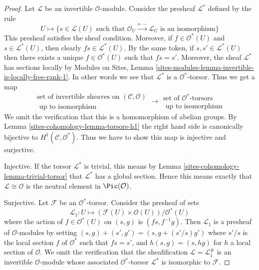 \begin{proof}
Let $\mathcal{L}$ be an invertible $\mathcal{O}$-module.
Consider the presheaf $\mathcal{L}^*$ defined by the rule
$$
U \longmapsto \{s \in \mathcal{L}(U)
\text{ such that } \mathcal{O}_U \xrightarrow{s \cdot -} \mathcal{L}_U
\text{ is an isomorphism}\}
$$
This presheaf satisfies the sheaf condition. Moreover, if
$f \in \mathcal{O}^*(U)$ and $s \in \mathcal{L}^*(U)$, then clearly
$fs \in \mathcal{L}^*(U)$. By the same token, if $s, s' \in \mathcal{L}^*(U)$
then there exists a unique $f \in \mathcal{O}^*(U)$ such that
$fs = s'$. Moreover, the sheaf $\mathcal{L}^*$ has sections locally
by Modules on Sites, Lemma
\ref{sites-modules-lemma-invertible-is-locally-free-rank-1}.
In other words we
see that $\mathcal{L}^*$ is a $\mathcal{O}^*$-torsor. Thus we get
a map
$$
\begin{matrix}
\text{set of invertible sheaves on }(\mathcal{C}, \mathcal{O}) \\
\text{ up to isomorphism}
\end{matrix}
\longrightarrow
\begin{matrix}
\text{set of }\mathcal{O}^*\text{-torsors} \\
\text{ up to isomorphism}
\end{matrix}
$$
We omit the verification that this is a homomorphism of abelian groups.
By
Lemma \ref{sites-cohomology-lemma-torsors-h1}
the right hand side is canonically
bijective to $H^1(\mathcal{C}, \mathcal{O}^*)$.
Thus we have to show this map is injective and surjective.

\medskip\noindent
Injective. If the torsor $\mathcal{L}^*$ is trivial, this means by
Lemma \ref{sites-cohomology-lemma-trivial-torsor}
that $\mathcal{L}^*$ has a global section.
Hence this means exactly that $\mathcal{L} \cong \mathcal{O}$ is
the neutral element in $\Pic(\mathcal{O})$.

\medskip\noindent
Surjective. Let $\mathcal{F}$ be an $\mathcal{O}^*$-torsor.
Consider the presheaf of sets
$$
\mathcal{L}_1 : U \longmapsto
(\mathcal{F}(U) \times \mathcal{O}(U))/\mathcal{O}^*(U)
$$
where the action of $f \in \mathcal{O}^*(U)$ on
$(s, g)$ is $(fs, f^{-1}g)$. Then $\mathcal{L}_1$ is a presheaf
of $\mathcal{O}$-modules by setting
$(s, g) + (s', g') = (s, g + (s'/s)g')$ where $s'/s$ is the local
section $f$ of $\mathcal{O}^*$ such that $fs = s'$, and
$h(s, g) = (s, hg)$ for $h$ a local section of $\mathcal{O}$.
We omit the verification that the sheafification
$\mathcal{L} = \mathcal{L}_1^\#$ is an invertible $\mathcal{O}$-module
whose associated $\mathcal{O}^*$-torsor $\mathcal{L}^*$ is isomorphic
to $\mathcal{F}$.
\end{proof}

